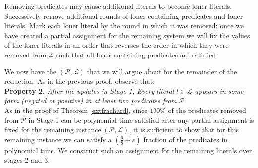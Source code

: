 \documentclass{article}
\begin{document}
Removing predicates may cause additional literals to become loner literals. Successively remove additional rounds of loner-containing predicates and loner literals. Mark each loner literal by the round in which it was removed: once we have created a partial assignment for the remaining system we will fix the values of the loner literals in an order that reverses the order in which they were removed from $\mathcal{L}$ such that all loner-containing predicates are satisfied. 

We now have the $(\mathcal{P}, \mathcal{L})$ that we will argue about for the remainder of the reduction. As in the previous proof, observe that: \\

\noindent \textbf{Property 2.} \textit{After the updates in Stage 1, Every literal $l\in \mathcal{L}$ appears in some form (negated or positive) in at least two predicates from $\mathcal{P}$.}\\

As in the proof of Theorem \ref{extfrachard}, since $100\%$ of the predicates removed from $\mathcal{P}$ in Stage 1 can be polynomial-time satisfied after any partial assignment is fixed for the remaining instance $(\mathcal{P}, \mathcal{L})$, it is sufficient to show that for this remaining instance we can satisfy a $(\frac{6}{8}+\epsilon)$ fraction of the predicates in polynomial time. We construct such an assignment for the remaining literals over stages 2 and 3.
\end{document}
